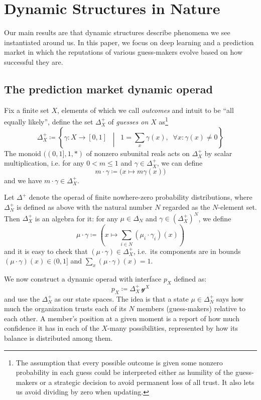 \documentclass[11pt, one side, article]{memoir}
\theoremstyle{definition}
\theoremstyle{plain}
\newcommand{\yon}{\mathcal{y}}
\newcommand{\0}{\textsf{0}}
\newcommand{\1}{\tn{\textsf{1}}}
\newcommand{\bet}{\Delta^+}
\begin{document}
\chapter{Dynamic Structures in Nature}
%

Our main results are that dynamic structures describe phenomena we see instantiated around us. In this paper, we focus on deep learning and a prediction market in which the reputations of various guess-makers evolve based on how successful they are.


\section{The prediction market dynamic operad}\label{sec.kelley}


Fix a finite set $X$, elements of which we call \emph{outcomes} and intuit to be ``all equally likely'', define the set $\bet_X$ of \emph{guesses on $X$} as\footnote{The assumption that every possible outcome is given some nonzero probability in each guess could be interpreted either as humility of the guess-makers or a strategic decision to avoid permanent loss of all trust. It also lets us avoid dividing by zero when updating.}
\[
	\bet_X\coloneqq\left\{\gamma\colon X\to[0,1]\;\;\middle|\;\;1=\sum_x\gamma(x), \;\; \forall x\colon \gamma(x) \neq 0 \right\}
\]
The monoid $((0,1],1,*)$ of nonzero subunital reals acts on $\bet_X$ by scalar multiplication, i.e. for any $0 < m\leq 1$ and $\gamma\in\bet_X$, we can define
\[
	m\cdot \gamma\coloneqq \big(x\mapsto m\gamma (x)\big)
\]
and we have $m\cdot\gamma\in\bet_X$. 

Let $\Delta^+$ denote the operad of finite nowhere-zero probability distributions, where $\Delta^+_N$ is defined as above with the natural number $N$ regarded as the $N$-element set. %
Then $\bet_X$ is an algebra for it: for any $\mu\in\Delta_N$ and $\gamma \in (\bet_X)^N$, we define 
\[
	\mu\cdot\gamma\coloneqq\left(x\mapsto\sum_{i\in N}(\mu_i\cdot\gamma_i)(x)\right)
\]
and it is easy to check that $(\mu\cdot\gamma)\in\bet_X$, i.e.\ its components are in bounds $(\mu\cdot\gamma)(x)\in (0,1]$ and $\sum_x(\mu\cdot\gamma)(x)=1$.

We now construct a dynamic operad with interface $p_X$ defined as:
\[
p_X\coloneqq \bet_X\,\yon^X
\]
and use the $\Delta^+_N$ as our state spaces. The idea is that a state $\mu\in\Delta^+_N$ says how much the organization trusts each of its $N$ members (guess-makers) relative to each other. A member's position at a given moment is a report of how much confidence it has in each of the $X$-many possibilities, represented by how its balance is distributed among them.
\end{document}
